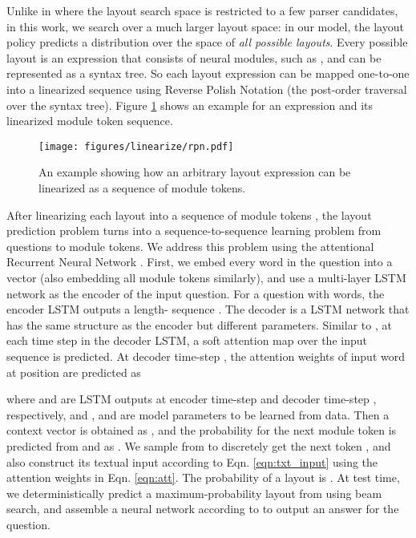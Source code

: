 \documentclass[10pt,twocolumn,letterpaper]{article}
\begin{document}
Unlike in \cite{andreas2016learning} where the layout search space is restricted to a few parser candidates, in this work, we search over a much larger layout space: in our model, the layout policy  predicts a distribution over the space of \textit{all possible layouts}. Every possible layout  is an expression that consists of neural modules, such as , and can be represented as a syntax tree. So each layout expression can be mapped one-to-one into a linearized sequence  using Reverse Polish Notation \cite{burks54analysis} (the post-order traversal over the syntax tree). Figure \ref{fig:linearize} shows an example for an expression and its linearized module token sequence.

\begin{figure}[t]
\centering
\texttt{[image: figures/linearize/rpn.pdf]}\vspace{-0.2cm}
\caption{An example showing how an arbitrary layout expression can be linearized as a sequence of module tokens.}
\label{fig:linearize}
\vspace{-0.5cm}
\end{figure}

After linearizing each layout  into a sequence of module tokens , the layout prediction problem turns into a sequence-to-sequence learning problem from questions to module tokens. We address this problem using the attentional Recurrent Neural Network \cite{bahdanau2015neural}. First, we embed every word  in the question into a vector  (also embedding all module tokens similarly), and use a multi-layer LSTM network as the encoder of the input question. For a question  with  words, the encoder LSTM outputs a length- sequence . The decoder is a LSTM network that has the same structure as the encoder but different parameters. Similar to \cite{bahdanau2015neural}, at each time step in the decoder LSTM, a soft attention map over the input sequence is predicted. At decoder time-step , the attention weights  of input word at position  are predicted as

where  and  are LSTM outputs at encoder time-step  and decoder time-step , respectively, and ,  and  are model parameters to be learned from data. Then a context vector  is obtained as , and the probability for the next module token  is predicted from  and  as
.
We sample from  to discretely get the next token , and also construct its textual input  according to Eqn. \ref{eqn:txt_input} using the attention weights  in Eqn. \ref{eqn:att}. The probability of a layout  is
.
At test time, we deterministically predict a maximum-probability layout  from  using beam search, and assemble a neural network according to  to output an answer for the question.
\end{document}
